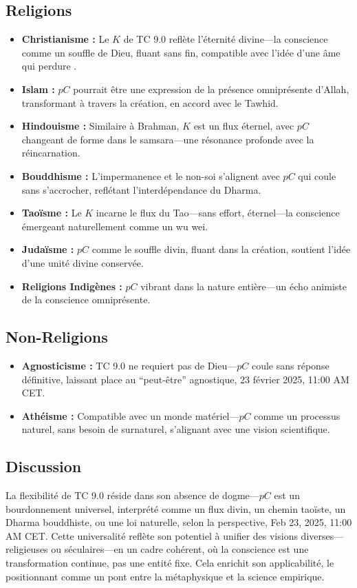 \documentclass[11pt]{article}
\begin{document}
\subsection{Religions}
\begin{itemize}
    \item \textbf{Christianisme :} Le \( K \) de TC 9.0 reflète l’éternité divine—la conscience comme un souffle de Dieu, fluant sans fin, compatible avec l’idée d’une âme qui perdure \citep{tononi2008consciousness}.
    \item \textbf{Islam :} \( pC \) pourrait être une expression de la présence omniprésente d’Allah, transformant à travers la création, en accord avec le Tawhid.
    \item \textbf{Hindouisme :} Similaire à Brahman, \( K \) est un flux éternel, avec \( pC \) changeant de forme dans le samsara—une résonance profonde avec la réincarnation.
    \item \textbf{Bouddhisme :} L’impermanence et le non-soi s’alignent avec \( pC \) qui coule sans s’accrocher, reflétant l’interdépendance du Dharma.
    \item \textbf{Taoïsme :} Le \( K \) incarne le flux du Tao—sans effort, éternel—la conscience émergeant naturellement comme un wu wei.
    \item \textbf{Judaïsme :} \( pC \) comme le souffle divin, fluant dans la création, soutient l’idée d’une unité divine conservée.
    \item \textbf{Religions Indigènes :} \( pC \) vibrant dans la nature entière—un écho animiste de la conscience omniprésente.
\end{itemize}

\subsection{Non-Religions}
\begin{itemize}
    \item \textbf{Agnosticisme :} TC 9.0 ne requiert pas de Dieu—\( pC \) coule sans réponse définitive, laissant place au “peut-être” agnostique, 23 février 2025, 11:00 AM CET.
    \item \textbf{Athéisme :} Compatible avec un monde matériel—\( pC \) comme un processus naturel, sans besoin de surnaturel, s’alignant avec une vision scientifique.
\end{itemize}

\subsection{Discussion}
La flexibilité de TC 9.0 réside dans son absence de dogme—\( pC \) est un bourdonnement universel, interprété comme un flux divin, un chemin taoïste, un Dharma bouddhiste, ou une loi naturelle, selon la perspective, Feb 23, 2025, 11:00 AM CET. Cette universalité reflète son potentiel à unifier des visions diverses—religieuses ou séculaires—en un cadre cohérent, où la conscience est une transformation continue, pas une entité fixe. Cela enrichit son applicabilité, le positionnant comme un pont entre la métaphysique et la science empirique.
\end{document}
